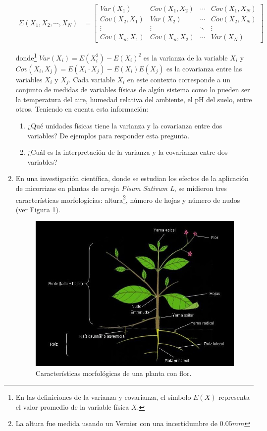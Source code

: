 \documentclass{article}
\begin{document}
\begin{enumerate}
\begin{align*}
\Sigma(X_{1},X_{2},\cdots, X_{N})&=\left[\begin{matrix}
Var(X_{1}) & Cov(X_{1},X_{2}) & \cdots & Cov(X_{1},X_{N})\\
Cov(X_{2},X_{1}) & Var(X_{2}) & \cdots & Cov(X_{2},X_{N})\\
\vdots & \vdots & \ddots & \vdots \\
Cov(X_{n},X_{1}) & Cov(X_{n},X_{2}) & \cdots & Var(X_{N})
\end{matrix}\right]
\end{align*}


\noindent donde\footnote{En las definiciones de la varianza y covarianza, el símbolo $E(X)$ representa el valor promedio de la variable física $X$.} $Var(X_{i})=E(X_{i}^2)-E(X_{i})^2$ es la varianza de la variable $X_{i}$ y $Cov(X_{i},X_{j})=E(X_{i}\cdot X_{j})-E(X_{i})E(X_{j})$ es la covarianza entre las variables $X_{i}$ y $X_{j}$. Cada variable $X_{i}$ en este contexto corresponde a un conjunto de medidas de variables físicas de algún sistema como lo pueden ser la temperatura del aire, humedad relativa del ambiente, el pH del suelo, entre otros. Teniendo en cuenta esta información: 


\begin{enumerate}
\item ¿Qué unidades físicas tiene la varianza y la covarianza entre dos variables? De ejemplos para responder esta pregunta.
\item ¿Cuál es la interpretación de la varianza y la covarianza entre dos variables?
\end{enumerate}


\item En una investigación científica, donde se estudian los efectos de la aplicación de micorrizas en plantas de arveja \textit{Pisum Sativum L}, se midieron tres características morfologicias: altura\footnote{La altura fue medida usando un Vernier con una incertidumbre de $0.05mm$}, número de hojas y número de nudos (ver Figura \ref{planta}).  


\begin{figure}[H]
\centering
\includegraphics[scale=0.3]{planta.jpg}
\caption{Características morfológicas de una planta con flor.}
\label{planta}
\end{figure}



\end{enumerate}
\end{document}
